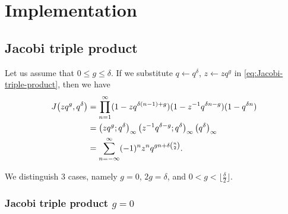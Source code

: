 \documentclass{article}
\begin{document}
\section{Implementation}



\subsection{Jacobi triple product}
\label{sec:Jacobi-triple-product-implementation}

Let us assume that $0 \le g \le \delta$. If we substitute
$q \gets q^\delta$, $z \gets z q^g$ in
\eqref{eq:Jacobi-triple-product}, then we have
\begin{align*}
  J\!\left(zq^g,q^\delta\right)
  &=
  \prod_{n=1}^\infty
    (1-zq^{\delta (n-1)+g})
    (1-z^{-1}q^{\delta n-g})
    (1-q^{\delta n})
  \\
  &=
    \left( zq^g;q^\delta \right)_{\infty} \left( z^{-1}q^{\delta-g};q^\delta \right)_{\infty}
    \left({q}^{\delta}\right)_{\infty}
  \\
  &=
    \sum_{n=-\infty}^\infty (-1)^nz^nq^{gn + \delta \binom{n}{2}}.
\end{align*}

We distinguish 3 cases, namely $g=0$, $2g=\delta$, and
$0 < g < \lfloor \frac{\delta}{2}\rfloor$.



\subsubsection{Jacobi triple product $g=0$}
\end{document}
